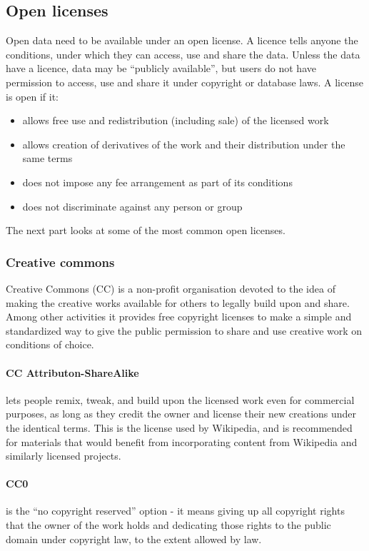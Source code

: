 \documentclass[thesis=B,english]{sprlajur-slovakopendata}[2018/05/12]
\begin{document}
\subsection{Open licenses}
\label{licenses}
Open data need to be available under an open license. A licence tells anyone the conditions, under which they can access, use and share the data. Unless the data have a licence, data may be ``publicly available'', but users do not have permission to access, use and share it under copyright or database laws. A license is open if it:
\begin{itemize}
	\item allows free use and redistribution (including sale) of the licensed work
	\item allows creation of derivatives of the work and their distribution under the same terms
	\item does not impose any fee arrangement as part of its conditions
	\item does not discriminate against any person or group
\end{itemize} 
The next part looks at some of the most common open licenses. 
\subsubsection{Creative commons}
Creative Commons (CC) is a non-profit organisation devoted to the idea of making the creative works available for others to legally build upon and share. Among other activities it provides free copyright licenses to make a simple and standardized way to give the public permission to share and use creative work on conditions of choice. \cite{creativecommons}
\paragraph{CC Attributon-ShareAlike}
lets people remix, tweak, and build upon the licensed work even for commercial purposes, as long as they credit the owner and license their new creations under the identical terms. This is the license used by Wikipedia, and is recommended for materials that would benefit from incorporating content from Wikipedia and similarly licensed projects.
\paragraph{CC0}
is the ``no copyright reserved'' option - it means giving up all copyright rights that the owner of the work holds and dedicating those rights to the public domain under copyright law, to the extent allowed by law.
\end{document}
